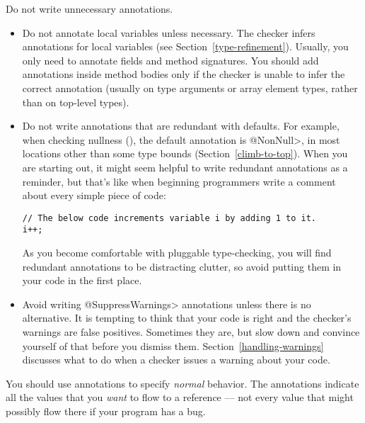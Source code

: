 Do not write unnecessary annotations.
\begin{itemize}
\item
  Do not annotate local variables unless necessary.  The checker infers
  annotations for local variables (see Section~\ref{type-refinement}).
  Usually, you only need to annotate fields and method signatures.  You
  should add annotations inside method bodies only if the checker is unable
  to infer the correct annotation (usually on type arguments or array
  element types, rather than
  on top-level types).

\item
  Do not write annotations that are redundant with defaults.  For example,
  when checking nullness (), the default
  annotation is \<@NonNull>, in most locations other than some type bounds
  (Section~\ref{climb-to-top}).  When you are starting out, it might seem
  helpful to write redundant annotations as a reminder, but that's like
  when beginning programmers write a comment about every simple piece of
  code:

\begin{Verbatim}
// The below code increments variable i by adding 1 to it.
i++;
\end{Verbatim}

  As you become comfortable with pluggable type-checking, you will find
  redundant annotations to be distracting clutter, so avoid putting them in
  your code in the first place.

\item
  Avoid writing \<@SuppressWarnings> annotations unless there is no
  alternative.  It is tempting to think that your code is right and the
  checker's warnings are false positives.  Sometimes they are, but slow
  down and convince yourself of that before you dismiss them.
  Section~\ref{handling-warnings} discusses what to do when a checker
  issues a warning about your code.

\end{itemize}



You should use annotations to specify \emph{normal} behavior.  The
annotations indicate all the values that you \emph{want} to flow to a
reference --- not every value that might possibly flow there if your
program has a bug.


